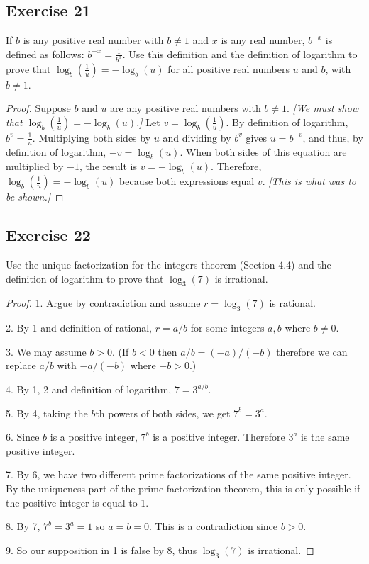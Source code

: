\documentclass[14pt]{extarticle}
\newcommand{\dps}{\displaystyle}
\begin{document}
\subsection{Exercise 21}
If $b$ is any positive real number with \(b \neq 1\) and $x$ is any real number, \(b^{-x}\) is defined as follows: 
\(\dps b^{-x} = \frac{1}{b^x}\). Use this definition and the definition of logarithm to prove that \(\dps \log_b 
\left(\frac{1}{u}\right) = -\log_b(u)\) for all positive real numbers $u$ and $b$, with \(b \neq 1\).

\begin{proof}
Suppose $b$ and $u$ are any positive real numbers with \(b \neq 1\). {\it [We must show that \(\log_b (\frac{1}{u}) = 
-\log_b(u)\).]} Let \(v = \log_b (\frac{1}{u})\). By definition of logarithm, \(b^v = \frac{1}{u}\). Multiplying 
both sides by $u$ and dividing by $b^v$ gives \(u=b^{-v}\), and thus, by definition of logarithm, \(-v = \log_b(u)\). 
When both sides of this equation are multiplied by $-1$, the result is \(v = -\log_b(u)\). Therefore, \(\log_b 
(\frac{1}{u}) = - \log_b(u)\) because both expressions equal $v$. {\it [This is what was to be shown.]}
\end{proof}

\subsection{Exercise 22}
Use the unique factorization for the integers theorem (Section 4.4) and the definition of logarithm to prove that 
$\log_3(7)$ is irrational.

\begin{proof}
1. Argue by contradiction and assume \(r = \log_3(7)\) is rational.

2. By 1 and definition of rational, \(r = a / b\) for some integers $a,b$ where $b \neq 0$.

3. We may assume \(b > 0\). (If \(b < 0\) then \(a/b = (-a)/(-b)\) therefore we can replace $a/b$ with $-a/(-b)$
where \(-b > 0\).)

4. By 1, 2 and definition of logarithm, \(7 = 3^{a/b}\).

5. By 4, taking the $b$th powers of both sides, we get \(7^b = 3^a\).

6. Since \(b\) is a positive integer, \(7^b\) is a positive integer. Therefore \(3^a\) is the same positive integer.

7. By 6, we have two different prime factorizations of the same positive integer. By the uniqueness part of the prime
factorization theorem, this is only possible if the positive integer is equal to 1.

8. By 7, \(7^b = 3^a = 1\) so \(a = b = 0\). This is a contradiction since \(b > 0\).

9. So our supposition in 1 is false by 8, thus \(\log_3(7)\) is irrational.
\end{proof}
\end{document}
